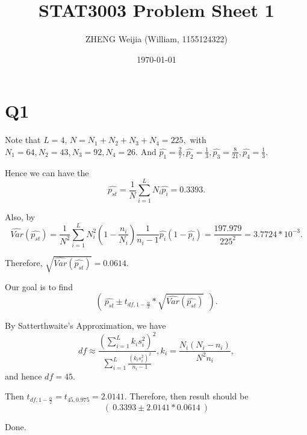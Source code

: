 \documentclass[12pt]{article}%
\begin{document}
\title{STAT3003 Problem Sheet 1}
\author{ZHENG Weijia (William, 1155124322)}
\date{\today}
\maketitle



\section{Q1}

Note that $L=4$, $N=N_1+N_2+N_3+N_4 = 225,$ with $N_1=64, N_2=43, N_3 = 92, N_4=26.$ And $\hat{p_1}=\frac{2}{7}, \hat{p_2}=\frac{1}{3}, \hat{p_3}=\frac{8}{21}, \hat{p_4}=\frac{1}{3}.$

Hence we can have the $$\hat{p_{st}}=\frac{1}{N}\sum_{i=1}^{L}N_i \hat{p_i}=0.3393.$$

Also, by $$\hat{Var}(\hat{p_{st}})=\frac{1}{N^2}\sum_{i=1}^{L}N_i^2(1-\frac{n_i}{N_i})\frac{1}{n_i-1}\hat{p_i}(1-\hat{p_i})=\frac{197.979}{225^2}=3.7724*10^{-3}.$$

Therefore, $\sqrt{\hat{Var}(\hat{p_{st}})}=0.0614.$

Our goal is to find $$(~\hat{p_{st}} \pm t_{df,1-\frac{\alpha}{2}}*\sqrt{\hat{Var}(\hat{p_{st}})}~~).$$

By Satterthwaite's Approximation, we have $$df \approx \frac{(\sum_{i=1}^{L}k_i s_{i}^2)^2}{\sum_{i=1}^{L}\frac{(k_i s_i^2)^2}{n_i-1}}, k_i=\frac{N_i(N_i-n_i)}{N^2n_i},$$ and hence $df=45.$

Then $t_{df,1-\frac{\alpha}{2}}=t_{45,0.975}=2.0141.$ Therefore, then result should be $$(~0.3393\pm 2.0141*0.0614~)$$

Done.

~\ 
\end{document}
